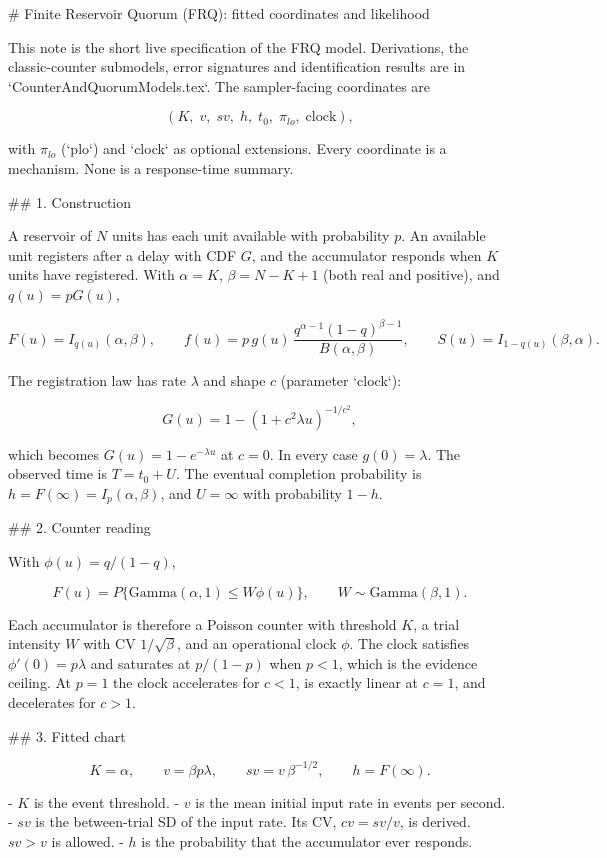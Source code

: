 # Finite Reservoir Quorum (FRQ): fitted coordinates and likelihood

This note is the short live specification of the FRQ model. Derivations,
the classic-counter submodels, error signatures and identification results
are in `CounterAndQuorumModels.tex`. The sampler-facing coordinates are

\[
  (K,\;v,\;sv,\;h,\;t_0,\;\pi_{lo},\;\mathrm{clock}),
\]

with \(\pi_{lo}\) (`plo`) and `clock` as optional extensions. Every coordinate is a
mechanism. None is a response-time summary.

## 1. Construction

A reservoir of \(N\) units has each unit available with probability \(p\).
An available unit registers after a delay with CDF \(G\), and the accumulator
responds when \(K\) units have registered. With \(\alpha=K\),
\(\beta=N-K+1\) (both real and positive), and \(q(u)=pG(u)\),

\[
  F(u)=I_{q(u)}(\alpha,\beta),\qquad
  f(u)=p\,g(u)\,\frac{q^{\alpha-1}(1-q)^{\beta-1}}{B(\alpha,\beta)},\qquad
  S(u)=I_{1-q(u)}(\beta,\alpha).
\]

The registration law has rate \(\lambda\) and shape \(c\) (parameter `clock`):

\[
  G(u)=1-\left(1+c^2\lambda u\right)^{-1/c^2},
\]

which becomes \(G(u)=1-e^{-\lambda u}\) at \(c=0\). In every case
\(g(0)=\lambda\). The observed time is \(T=t_0+U\). The eventual completion
probability is \(h=F(\infty)=I_p(\alpha,\beta)\), and \(U=\infty\) with
probability \(1-h\).

## 2. Counter reading

With \(\phi(u)=q/(1-q)\),

\[
  F(u)=P\{\mathrm{Gamma}(\alpha,1)\le W\phi(u)\},\qquad
  W\sim\mathrm{Gamma}(\beta,1).
\]

Each accumulator is therefore a Poisson counter with threshold \(K\), a trial
intensity \(W\) with CV \(1/\sqrt\beta\), and an operational clock \(\phi\).
The clock satisfies \(\phi'(0)=p\lambda\) and saturates at \(p/(1-p)\) when
\(p<1\), which is the evidence ceiling. At \(p=1\) the clock accelerates for
\(c<1\), is exactly linear at \(c=1\), and decelerates for \(c>1\).

## 3. Fitted chart

\[
  K=\alpha,\qquad v=\beta p\lambda,\qquad sv=v\,\beta^{-1/2},\qquad h=F(\infty).
\]

- \(K\) is the event threshold.
- \(v\) is the mean initial input rate in events per second.
- \(sv\) is the between-trial SD of the input rate. Its CV, \(cv=sv/v\), is
  derived. \(sv>v\) is allowed.
- \(h\) is the probability that the accumulator ever responds.

